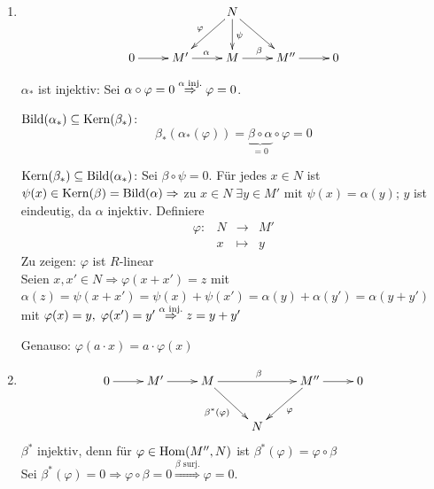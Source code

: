\documentclass[a4paper, 10pt]{report}
\begin{document}
\begin{Bew}
  \begin{enumerate}
    \item $$
	  \begin{xy}
	  \xymatrix{
	         &                    &  N \ar[ld]_\varphi \ar[d]^\psi \ar[dr] & & \\
	0 \ar[r] & M' \ar[r]^{\alpha} & M \ar[r]^{\beta} & M'' \ar[r] & 0
	}
	\end{xy}
	$$

          $\alpha_*$ ist injektiv: Sei $\alpha \circ \varphi = 0 \overset{\alpha
          \text{ \scriptsize inj.}}{\Rightarrow} \varphi = 0$.

          $\mathrm{Bild}(\alpha_*) \subseteq \mathrm{Kern}(\beta_*)$:
          \[
          \beta_*(\alpha_*(\varphi)) = \underset{=0}{\underbrace{\beta \circ
          \alpha}} \circ \varphi = 0
          \]

          $\mathrm{Kern}(\beta_*) \subseteq \mathrm{Bild}(\alpha_*)$:
          Sei $\beta \circ \psi = 0$. Für jedes $x \in N$ ist $\psi(x) \in
          \mathrm{Kern}(\beta) = \mathrm{Bild}(\alpha) \Rightarrow$ zu $x \in N \;
          \exists y \in M' \text{ mit } \psi(x) = \alpha(y)$; $y$ ist
          eindeutig, da $\alpha$ injektiv.
          Definiere
          \[
          \begin{matrix}
          \varphi:& N &\to& M'\\
          &x &\mapsto& y
          \end{matrix}
          \]
          Zu zeigen: $\varphi$ ist $R$-linear\\
          Seien $x,x' \in N \Rightarrow \varphi(x+x')=z$ mit $\alpha(z) =
          \psi(x+x') = \psi(x) + \psi(x') = \alpha(y) + \alpha(y') =
          \alpha(y +y')$ mit $\varphi(x) = y, \; \varphi(x') = y'
          \overset{\alpha \text{ \scriptsize inj.}}{\Rightarrow} z = y + y'$

          Genauso: $\varphi(a \cdot x) = a \cdot \varphi(x)$
    \item \[
            \begin{xy}
              \xymatrix{
                0 \ar[r] & M' \ar[r] & M \ar[rr]^{\beta} \ar[rd]_{\beta^*(\varphi)} &  &  M'' \ar[dl]^{\varphi} \ar[r] & 0 \\
                & & & N & }
            \end{xy}
          \]
          $\beta^*$ injektiv, denn für $\varphi \in \Hom{M''}{N}$ ist
          $\beta^*(\varphi)=\varphi\circ \beta$\\
	  Sei $\beta^*(\varphi)= 0 \Rightarrow \varphi \circ \beta = 0 \overset{\beta
	  \text{ surj.}}{\Rightarrow}\varphi=0$.


\end{enumerate}
\end{Bew}
\end{document}
